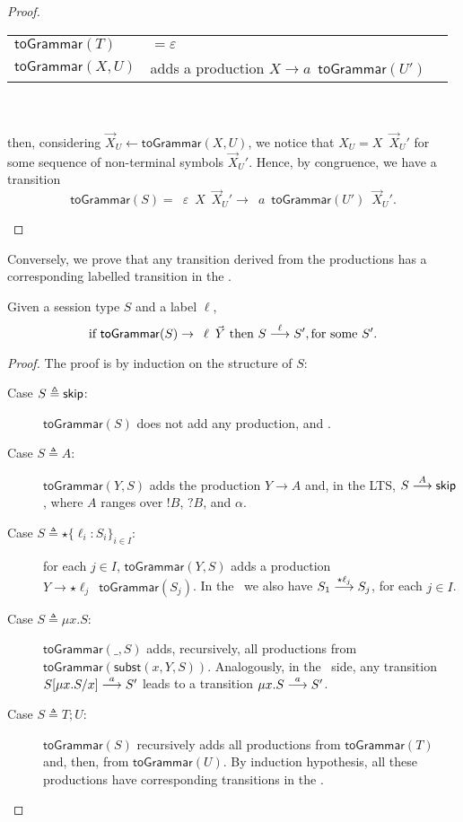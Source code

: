 \begin{proof}
\begin{itemize}
	    \begin{tabular}{lll}
			$\mathsf{toGrammar}(T)$ & $= \varepsilon$\\
			$\mathsf{toGrammar}(X,U)$ & adds a production 
			$X \rightarrow a \enspace \mathsf{toGrammar}(U')$
		\end{tabular}\\\\
		then, considering $\vec X_U \leftarrow \mathsf{toGrammar}(X,U)$, 
		we notice that $X_U = X \enspace \vec X_U'$ for some sequence of 
		non-terminal symbols $\vec X_U'$. Hence, by congruence, we have a 
		transition 
		\[\mathsf{toGrammar}(S) = \enspace \varepsilon \enspace X \enspace 
		\vec X_U' \rightarrow \enspace a \enspace \mathsf{toGrammar}(U') \enspace 
		\vec X_U'.\]
\end{itemize}
\end{proof}

Conversely, we prove that any transition derived from the productions 
has a corresponding labelled transition in the \LTS.

\begin{lemma}
Given a session type $S$ and a label $\ell$,
	\[ \text{if } \mathsf{toGrammar}(S) \rightarrow \enspace \ell \enspace 
	 \vec Y \text{ then } S \LTSderives[\ell] S', \text{for some $S'$}.\]
\end{lemma}

\begin{proof}
	The proof is by induction on the structure of $S$:
	\begin{description}
		\item[Case $S \triangleq \skipk$:] $\mathsf{toGrammar}(S)$ does not 
		     add any production, and .
		\item[Case $S \triangleq A$:] $\mathsf{toGrammar}(Y,S)$ adds the 
		     production $Y\rightarrow A$ and, in the LTS, $S \LTSderives[A] 
		     \skipk$, where $A$ ranges over $!B$, $?B$, and $\alpha$.
		\item[Case $S\triangleq \star \{\ell_i : S_i\}_{i\in I}$:] for each 
		     $j\in I$, $\mathsf{toGrammar}(Y,S)$ adds a production 
		     \linebreak $Y \rightarrow \star \ell_j \enspace 
		     \mathsf{toGrammar}(S_j)$. In the \LTS\ we also have 
		     $S_1 \LTSderives[\star \ell_j] S_j$, for each $j\in I$.
		\item[Case $S\triangleq \mu x.S$:] $\mathsf{toGrammar}(\_,S)$ adds, 
		     recursively, all productions from \linebreak$\mathsf{toGrammar}
		     (\mathsf{subst}(x,Y,S))$. Analogously, in the \LTS\ side, any transition 
		     $S[\mu x.S/x] \LTSderives[a] S'$ leads to a transition 
		     $\mu x.S \LTSderives[a] S'$.
		\item[Case $S \triangleq T;U$:] $\mathsf{toGrammar}(S)$ recursively adds 
		     all productions from  $\mathsf{toGrammar}(T)$ and, then, from $\mathsf{toGrammar}(U)$.
		     By induction hypothesis, all these productions have corresponding 
		     transitions in the \LTS.
	\end{description}
\end{proof}

